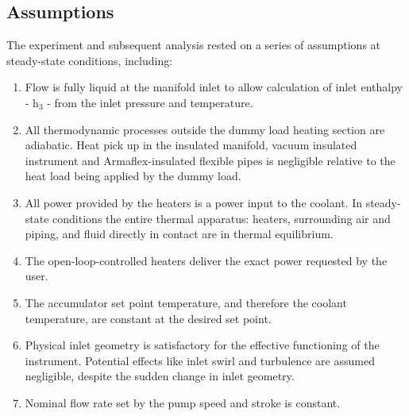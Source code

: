 \documentclass{report}
\begin{document}
\subsection{Assumptions}
The experiment and subsequent analysis rested on a series of assumptions at steady-state conditions, including:
\begin{enumerate}
\item{Flow is fully liquid at the manifold inlet to allow calculation of inlet enthalpy - h$_3$ - from the inlet pressure and temperature.}
\item{All thermodynamic processes outside the dummy load heating section are adiabatic. Heat pick up in the insulated manifold, vacuum insulated instrument and Armaflex-insulated flexible pipes is negligible relative to the heat load being applied by the dummy load.}
\item{All power provided by the heaters is a power input to the coolant. In steady-state conditions the entire thermal apparatus: heaters, surrounding air and piping, and fluid directly in contact are in thermal equilibrium.}
\item{The open-loop-controlled heaters deliver the exact power requested by the user.}
\item{The accumulator set point temperature, and therefore the coolant temperature, are constant at the desired set point.}
\item{Physical inlet geometry is satisfactory for the effective functioning of the instrument. Potential effects like inlet swirl and turbulence are assumed negligible, despite the sudden change in inlet geometry.}
\item{Nominal flow rate set by the pump speed and stroke is constant.}
\end{enumerate}
\end{document}
